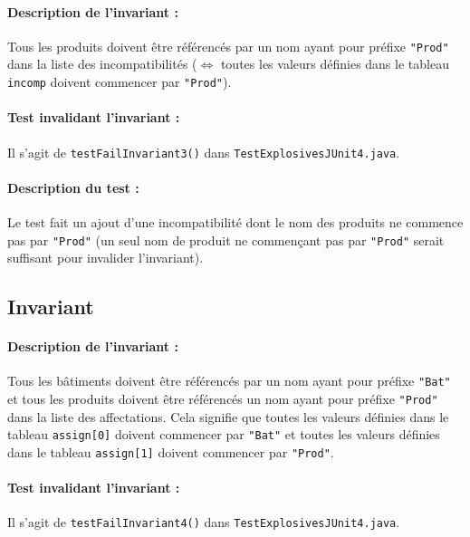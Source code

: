 \documentclass{article}
\begin{document}
\paragraph{Description de l'invariant :} Tous les produits doivent être référencés par un nom ayant pour préfixe \texttt{"Prod"} dans la liste des incompatibilités ($\Leftrightarrow$ toutes les valeurs définies dans le tableau \texttt{incomp} doivent commencer par \texttt{"Prod"}).

\vspace{-0.2cm}
\paragraph{Test invalidant l'invariant :} Il s'agit de \texttt{testFailInvariant3()} dans \texttt{TestExplosivesJUnit4.java}.

\vspace{-0.2cm}
\paragraph{Description du test :} Le test fait un ajout d'une incompatibilité dont le nom des produits ne commence pas par \texttt{"Prod"} (un seul nom de produit ne commençant pas par \texttt{"Prod"} serait suffisant pour invalider l'invariant).

\subsection{Invariant }

\paragraph{Description de l'invariant :} Tous les bâtiments doivent être référencés par un nom ayant pour préfixe \texttt{"Bat"} et tous les produits doivent être référencés un nom ayant pour préfixe \texttt{"Prod"} dans la liste des affectations. Cela signifie que toutes les valeurs définies dans le tableau \texttt{assign[0]} doivent commencer par \texttt{"Bat"} et toutes les valeurs définies dans le tableau \texttt{assign[1]} doivent commencer par \texttt{"Prod"}.

\vspace{-0.2cm}
\paragraph{Test invalidant l'invariant :} Il s'agit de \texttt{testFailInvariant4()} dans \texttt{TestExplosivesJUnit4.java}.
\end{document}
